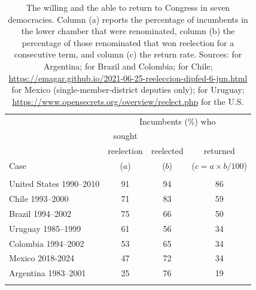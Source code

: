 \documentclass[letter,12pt]{article}
\newcommand{\mc}{\multicolumn}
\begin{document}
\begin{table}
  \centering
  \begin{tabular}{lccc}
                             & \mc{3}{c}{Incumbents (\%) who} \\ 
                             & sought      &             &            \\ [-.5ex]
                             & reelection  & reelected   & returned   \\ [-.5ex]
    Case                     &   ($a$)     &   ($b$)     & ($c=a\times b/100$) \\ \hline \\ [-1.25ex] 
    United States 1990--2010 &    91       &     94      &     86     \\ 
    Chile 1993--2000         &    71       &     83      &     59     \\
    Brazil 1994--2002        &    75       &     66      &     50     \\
    Uruguay 1985--1999       &    61       &     56      &     34     \\
    Colombia 1994--2002      &    53       &     65      &     34     \\                 
    Mexico 2018-2024         &    47       &     72      &     34     \\
    Argentina 1983--2001     &    25       &     76      &     19     \\ \\ [-1.25ex] \hline
  \end{tabular}
  \caption{The willing and the able to return to Congress in seven democracies. Column (a) reports the percentage of incumbents in the lower chamber that were renominated, column (b) the percentage of those renominated that won reelection for a consecutive term, and column (c) the return rate. Sources: \citet[][:658]{jones.etal.amateurLegis.2002} for Argentina; \citet{botero.renno-Career-reelec-br-col2007} for Brazil and Colombia; \citet{naviaIncumbency.2000} for Chile; \protect\url{https://emagar.github.io/2021-06-25-reeleccion-dipfed-6-jun.html} for Mexico (single-member-district deputies only); \citet{altman-chasquetti-Career-reelec-urug2005} for Uruguay; \protect\url{https://www.opensecrets.org/overview/reelect.php} for the U.S.}\label{T:retRate}
\end{table}
\end{document}

